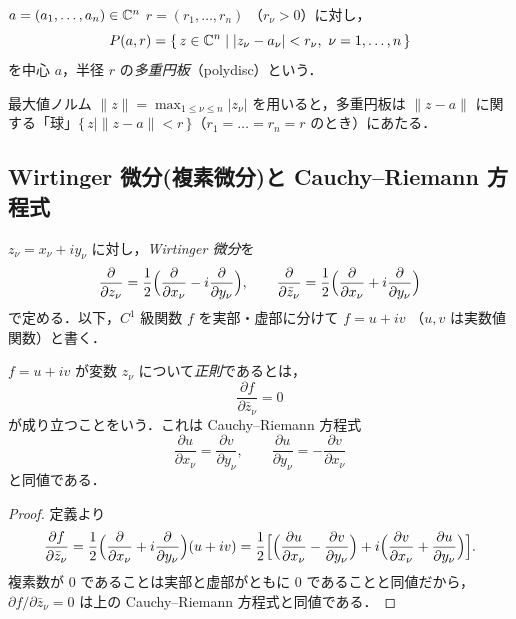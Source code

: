 \begin{definition}[多重円板]
$a = (a_1, \dots, a_n) \in \mathbb{C}^n$ $r = (r_1, \dots, r_n)$
（$r_\nu > 0$）に対し，
\[
  P(a, r) = \{\, z \in \mathbb{C}^n \mid |z_\nu - a_\nu| < r_\nu,\ \nu = 1, \dots, n \,\}
\]
を中心 $a$，半径 $r$ の\emph{多重円板}（polydisc）という．
\end{definition}

\begin{note}
最大値ノルム $\|z\| = \max_{1 \le \nu \le n} |z_\nu|$ を用いると，多重円板は
$\|z - a\|$ に関する「球」$\{\, z \mid \|z - a\| < r \,\}$（$r_1 = \dots = r_n = r$
のとき）にあたる．
\end{note}

\subsection*{Wirtinger 微分(複素微分)と Cauchy--Riemann 方程式}

$z_\nu = x_\nu + i y_\nu$ に対し，\emph{Wirtinger 微分}を
\[
  \frac{\partial}{\partial z_\nu}
    = \frac{1}{2}\Bigl( \frac{\partial}{\partial x_\nu} - i \frac{\partial}{\partial y_\nu} \Bigr),
  \qquad
  \frac{\partial}{\partial \bar z_\nu}
    = \frac{1}{2}\Bigl( \frac{\partial}{\partial x_\nu} + i \frac{\partial}{\partial y_\nu} \Bigr)
\]
で定める．以下，$C^1$ 級関数 $f$ を実部・虚部に分けて $f = u + i v$
（$u, v$ は実数値関数）と書く．

\begin{definition}
$f = u + i v$ が変数 $z_\nu$ について\emph{正則}であるとは，
\[
  \frac{\partial f}{\partial \bar z_\nu} = 0
\]
が成り立つことをいう．これは Cauchy--Riemann 方程式
\[
  \frac{\partial u}{\partial x_\nu} = \frac{\partial v}{\partial y_\nu}, \qquad
  \frac{\partial u}{\partial y_\nu} = -\frac{\partial v}{\partial x_\nu}
\]
と同値である．
\end{definition}

\begin{proof}
定義より
\[
  \frac{\partial f}{\partial \bar z_\nu}
  = \frac{1}{2}\Bigl( \frac{\partial}{\partial x_\nu} + i \frac{\partial}{\partial y_\nu} \Bigr)(u + i v)
  = \frac{1}{2}\Bigl[ \Bigl( \frac{\partial u}{\partial x_\nu} - \frac{\partial v}{\partial y_\nu} \Bigr)
      + i \Bigl( \frac{\partial v}{\partial x_\nu} + \frac{\partial u}{\partial y_\nu} \Bigr) \Bigr].
\]
複素数が $0$ であることは実部と虚部がともに $0$ であることと同値だから，
$\partial f / \partial \bar z_\nu = 0$ は上の Cauchy--Riemann 方程式と同値である．
\end{proof}

